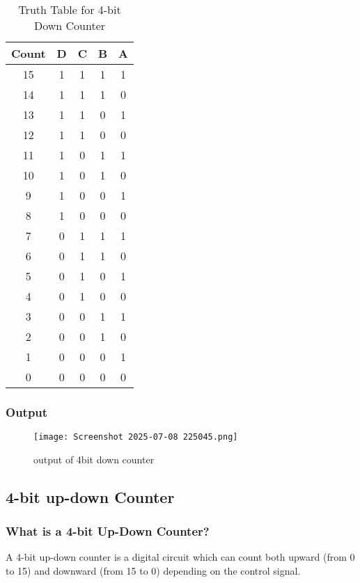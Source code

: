 \documentclass[12pt]{article}
\begin{document}
\begin{table}[H]
\centering
\begin{tabular}{|c|c|c|c|c|}
\hline
\textbf{Count} & \textbf{D} & \textbf{C} & \textbf{B} & \textbf{A} \\
\hline
15 & 1 & 1 & 1 & 1 \\
14 & 1 & 1 & 1 & 0 \\
13 & 1 & 1 & 0 & 1 \\
12 & 1 & 1 & 0 & 0 \\
11 & 1 & 0 & 1 & 1 \\
10 & 1 & 0 & 1 & 0 \\
9  & 1 & 0 & 0 & 1 \\
8  & 1 & 0 & 0 & 0 \\
7  & 0 & 1 & 1 & 1 \\
6  & 0 & 1 & 1 & 0 \\
5  & 0 & 1 & 0 & 1 \\
4  & 0 & 1 & 0 & 0 \\
3  & 0 & 0 & 1 & 1 \\
2  & 0 & 0 & 1 & 0 \\
1  & 0 & 0 & 0 & 1 \\
0  & 0 & 0 & 0 & 0 \\
\hline
\end{tabular}
\caption{Truth Table for 4-bit Down Counter}
\end{table}

\subsubsection{Output}
\begin{figure}[H]
    \centering
    \texttt{[image: Screenshot 2025-07-08 225045.png]}
    \caption{output of 4bit down counter}
    \label{fig:enter-label}
\end{figure}

\subsection{4-bit up-down Counter}
\subsubsection{What is a 4-bit Up-Down Counter?}
A 4-bit up-down counter is a digital circuit which can count both upward (from 0 to 15) and downward (from 15 to 0) depending on the control signal.
\end{document}

